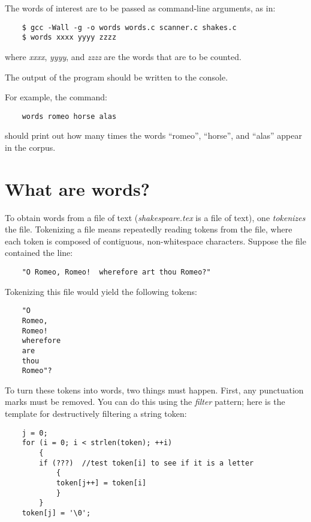 \documentclass[12pt]{article}
\begin{document}
The words of interest
are to be passed as command-line arguments, as in:

\begin{verbatim}
    $ gcc -Wall -g -o words words.c scanner.c shakes.c
    $ words xxxx yyyy zzzz
\end{verbatim}

where {\it xxxx}, {\it yyyy}, and {\it zzzz}
are the words that are to be counted.

The output of the program should be written to the console.

For example, the command:

\begin{verbatim}
    words romeo horse alas
\end{verbatim}

should print out how many times the words ``romeo'',
``horse'', and ``alas'' appear
in the corpus.

\section*{What are words?}

To obtain words from a file of text ({\it shakespeare.tex} is a file of text),
one {\it tokenizes} the file. Tokenizing a file means repeatedly reading
tokens from the file, where each token is composed of 
contiguous, non-whitespace characters.
Suppose the file contained the line:

\begin{verbatim}
    "O Romeo, Romeo!  wherefore art thou Romeo?"
\end{verbatim}

Tokenizing this file would yield the following tokens:

\begin{verbatim}
    "O
    Romeo,
    Romeo!
    wherefore
    are
    thou
    Romeo"?
\end{verbatim}

To turn these tokens into words, two things must happen.
First, any punctuation marks must
be removed. You can do this using the {\it filter} pattern; here is
the template for destructively filtering a string token:

\begin{verbatim}
    j = 0;
    for (i = 0; i < strlen(token); ++i)
        {
        if (???)  //test token[i] to see if it is a letter
            {
            token[j++] = token[i]
            }
        }
    token[j] = '\0';
\end{verbatim}
\end{document}
